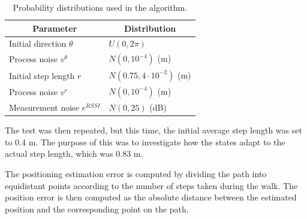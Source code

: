 \documentclass{LTHthesis}
\begin{document}
\begin{table}[!hbt]
\begin{center}
\begin{tabular}{|l|l|}
\hline
\multicolumn{1}{|c|}{Parameter} & \multicolumn{1}{c|}{Distribution} \\
\hline
\hline
Initial direction $\theta$ & $U(0,2\pi)$ \\
\hline
Process noise $v ^\theta$ & $N(0,10^{-4})$ (m)\\
\hline
Initial step length $r$ & $N(0.75, 4 \cdot 10^{-2})$ (m) \\
\hline
Process noise $v^r$ & $N(0,10^{-4})$ (m) \\
\hline
Measurement noise $e^{RSSI}$ & $N(0,25)$ (dB) \\
\hline


\end{tabular}
\end{center}
\caption{Probability distributions used in the algorithm.}\label{table:parameter_distributions}
\end{table}

The test was then repeated, but this time, the initial average step length was set to 0.4 m. The purpose of this was to investigate how the states adapt to the actual step length, which was 0.83 m.

The positioning estimation error is computed by dividing the path into equidistant points according to the number of steps taken during the walk. The position error is then computed as the absolute distance between the estimated position  and  the corresponding point on the path. 
%
\end{document}
